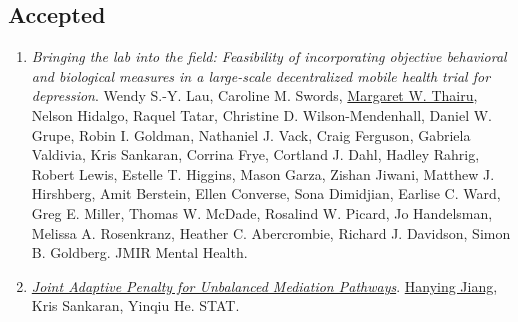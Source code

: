 \documentclass[letterpaper]{article}
\begin{document}
\subsection*{Accepted}
\begin{enumerate}
  \item \textit{Bringing the lab into the field: Feasibility of incorporating objective behavioral and biological measures in a large-scale decentralized mobile health trial for depression}. Wendy S.-Y. Lau, Caroline M. Swords, \underline{Margaret W. Thairu}, Nelson Hidalgo, Raquel Tatar, Christine D. Wilson-Mendenhall, Daniel W. Grupe, Robin I. Goldman, Nathaniel J. Vack, Craig Ferguson, Gabriela Valdivia, Kris Sankaran, Corrina Frye, Cortland J.  Dahl, Hadley Rahrig, Robert Lewis, Estelle T. Higgins, Mason Garza, Zishan Jiwani, Matthew J.  Hirshberg, Amit Berstein, Ellen Converse, Sona Dimidjian, Earlise C. Ward, Greg E. Miller, Thomas W. McDade, Rosalind W. Picard, Jo Handelsman, Melissa A. Rosenkranz, Heather C. Abercrombie, Richard J.  Davidson, Simon B.  Goldberg. JMIR Mental Health.
  \item \href{https://doi.org/10.48550/arXiv.2509.25527}{\textit{Joint Adaptive Penalty for Unbalanced Mediation Pathways}}. \underline{Hanying Jiang}, Kris Sankaran, Yinqiu He. STAT.
\end{enumerate}
\end{document}

